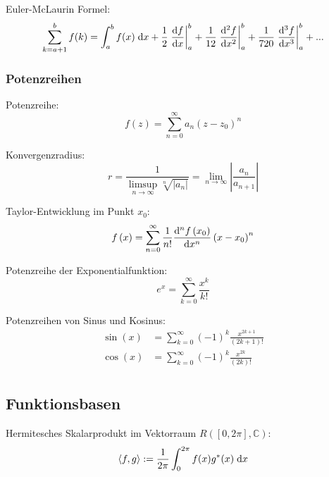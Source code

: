 \documentclass[11pt]{article}
\numberwithin{equation}{section}
\begin{document}
				\noindent
				Euler-McLaurin Formel:
				\begin{equation}
					\sum_{k=a+1}^{b} f(k) = \int_{a}^{b}f(x) \;\mathrm{d} x
					+ \frac{1}{2} \left.\frac{\mathrm{d} f}{\mathrm{d} x} \right|_{a}^{b}
					+ \frac{1}{12}\left.\frac{\mathrm{d}^2 f}{\mathrm{d} x^2} \right|_{a}^{b}
					+ \frac{1}{720} \left.\frac{\mathrm{d}^3 f}{\mathrm{d} x^3} \right|_{a}^{b}
					+ ...
				\end{equation}

			\subsubsection{Potenzreihen}
				\noindent
				Potenzreihe:
				\begin{equation}
					f(z) = \sum_{n=0}^{\infty} a_n (z-z_0)^n
				\end{equation}

				\noindent
				Konvergenzradius:
				\begin{equation}
					r = \frac{1}{\limsup\limits_{n\rightarrow\infty} \sqrt[n]{\left|a_n\right|}} = \lim_{n\rightarrow\infty}\left|\frac{a_n}{a_{n+1}}\right|
				\end{equation}

				\noindent
				Taylor-Entwicklung im Punkt $x_0$:
				\begin{equation}
					f\left(x\right)=\sum_{n=0}^{\infty}\frac{1}{n!}\frac{\mathrm{d}^{n}f\left(x_0\right)}{\mathrm{d} x^{n}}\left(x-x_0\right)^{n}
				\end{equation}

				\noindent
				Potenzreihe der Exponentialfunktion:
				\begin{equation}
					e^x=\sum_{k=0}^{\infty}{\frac{x^k}{k!}}
				\end{equation}

				\noindent
				Potenzreihen von Sinus und Kosinus:
				\begin{equation}
					\begin{aligned}
						\sin(x) &= \sum_{k=0}^\infty (-1)^k \frac{x^{2k+1}}{(2k+1)!} \\
						\cos(x) &= \sum_{k=0}^\infty (-1)^k \frac{x^{2k}}{(2k)!} \\
					\end{aligned}
				\end{equation}

		\subsection{Funktionsbasen}
			\noindent
			Hermitesches Skalarprodukt im Vektorraum $R([0,2\pi],\mathbb{C})$:
			\begin{equation}
				\left<f,g\right>:=\frac{1}{2\pi}\int_0^{2\pi} f(x)g^* (x)\;\mathrm{d} x
			\end{equation}
\end{document}
